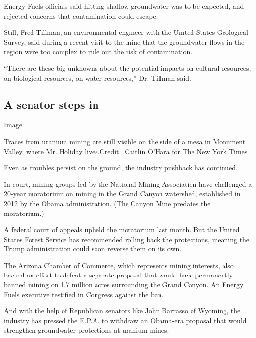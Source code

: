 Energy Fuels officials said hitting shallow groundwater was to be
expected, and rejected concerns that contamination could escape.

Still, Fred Tillman, an environmental engineer with the United States
Geological Survey, said during a recent visit to the mine that the
groundwater flows in the region were too complex to rule out the risk of
contamination.

``There are these big unknowns about the potential impacts on cultural
resources, on biological resources, on water resources,'' Dr. Tillman
said.

\hypertarget{a-senator-steps-in}{%
\subsection{A senator steps in}\label{a-senator-steps-in}}

Image

Traces from uranium mining are still visible on the side of a mesa in
Monument Valley, where Mr. Holiday lives.Credit...Caitlin O'Hara for The
New York Times

Even as troubles persist on the ground, the industry pushback has
continued.

In court, mining groups led by the National Mining Association have
challenged a 20-year moratorium on mining in the Grand Canyon watershed,
established in 2012 by the Obama administration. (The Canyon Mine
predates the moratorium.)

A federal court of appeals
\href{http://www.biologicaldiversity.org/programs/public_lands/mining/Grand_Canyon_Uranium_Mining/pdfs/9thCirOpinionAffirmingGrandCanyonWithdrawal-12-12-2017.pdf}{upheld
the moratorium last month}. But the United States Forest Service
\href{https://www.fs.fed.us/sites/default/files/eo-13783-usda-final-report-10.11.17.pdf}{has
recommended rolling back the protections}, meaning the Trump
administration could soon reverse them on its own.

The Arizona Chamber of Commerce, which represents mining interests, also
backed an effort to defeat a separate proposal that would have
permanently banned mining on 1.7 million acres surrounding the Grand
Canyon. An Energy Fuels executive
\href{https://gosar.house.gov/sites/gosar.house.gov/files/harold\%20r\%20roberts\%20testimony\%20april\%2011\%202016\%20(2).pdf}{testified
in Congress against the ban}.

And with the help of Republican senators like John Barrasso of Wyoming,
the industry has pressed the E.P.A. to withdraw
\href{https://www.epa.gov/radiation/40-cfr-part-192-proposed-rulemaking-and-background-documents}{an
Obama-era proposal} that would strengthen groundwater protections at
uranium mines.

